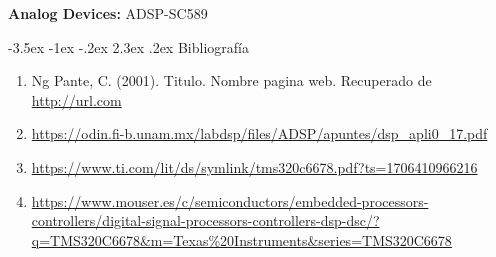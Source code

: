 \documentclass[11pt]{report}
\makeatletter
\renewcommand\chapter{\@startsection{chapter}{0}{\z@}%
    {-3.5ex \@plus -1ex \@minus -.2ex}%
    {2.3ex \@plus.2ex}%
    {\normalfont\Large\bfseries}}
\makeatother
\begin{document}
\textbf{Analog Devices:} ADSP-SC589 

\newpage

\chapter{Bibliografía} %
\begin{enumerate}
  \item Ng Pante, C. (2001). Titulo. Nombre pagina web. Recuperado de \url{http://url.com}
  \item \url{https://odin.fi-b.unam.mx/labdsp/files/ADSP/apuntes/dsp_apli0_17.pdf}
  \item \url{https://www.ti.com/lit/ds/symlink/tms320c6678.pdf?ts=1706410966216}
  \item \url{https://www.mouser.es/c/semiconductors/embedded-processors-controllers/digital-signal-processors-controllers-dsp-dsc/?q=TMS320C6678&m=Texas%20Instruments&series=TMS320C6678}

\end{enumerate}
\end{document}
